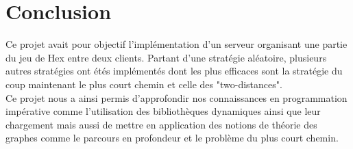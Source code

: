\section{Conclusion}

Ce projet avait pour objectif l'implémentation d'un serveur organisant une partie du jeu de Hex entre deux clients. Partant d'une stratégie aléatoire, plusieurs autres stratégies ont étés implémentés dont les plus efficaces sont la stratégie du coup maintenant le plus court chemin et celle des "two-distances".\\
Ce projet nous a ainsi permis d'approfondir nos connaissances en programmation impérative comme l'utilisation des bibliothèques dynamiques ainsi que leur chargement mais aussi de mettre en application des notions de théorie des graphes comme le parcours en profondeur et le problème du plus court chemin.

